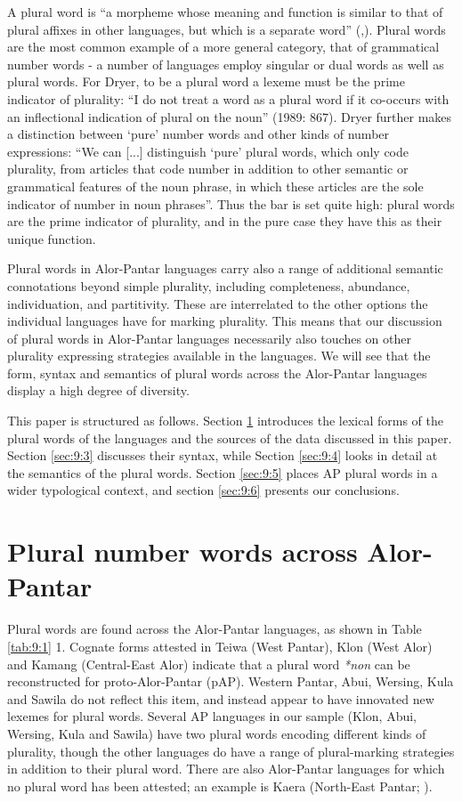 A plural word is ``a morpheme whose meaning and function is similar to that of plural affixes in other languages, but which is a separate word'' (\citealt[865]{Dryer1989},\citealt[166]{Dryer2007}). Plural words are the most common example of a more general category, that of grammatical number words - a number of languages employ singular or dual words as well as plural words. For Dryer, to be a plural word a lexeme must be the prime indicator of plurality: ``I do not treat a word as a plural word if it co-occurs with an inflectional indication of plural on the noun'' (1989: 867). Dryer further makes a distinction between `pure' number words and other kinds of number expressions: ``We can [...] distinguish `pure' plural words, which only code plurality, from articles that code number in addition to other semantic or grammatical features of the noun phrase, in which these articles are the sole indicator of number in noun phrases''. Thus the bar is set quite high: plural words are the prime indicator of plurality, and in the
pure case they have this as their unique function.

 Plural words in Alor-Pantar languages carry also a range of additional semantic connotations beyond simple plurality, including completeness, abundance, individuation, and partitivity. These are interrelated to the other options the individual languages have for marking plurality. This means that our discussion of plural words in Alor-Pantar languages necessarily also touches on other plurality expressing strategies available in the languages. We will see that the form, syntax and semantics of plural words across the Alor-Pantar languages display a high degree of diversity.

This paper is structured as follows. Section \ref{sec:9:2} introduces the lexical forms of the plural words of the languages and the sources of the data discussed in this paper. Section \ref{sec:9:3} discusses their syntax, while Section \ref{sec:9:4} looks in detail at the semantics of the plural words. Section \ref{sec:9:5} places AP plural words in a wider typological context, and section \ref{sec:9:6} presents our conclusions.

\section{Plural number words across Alor-Pantar}  %
\label{sec:9:2}
Plural words are found across the Alor-Pantar languages, as shown in Table \ref{tab:9:1} 1. Cognate forms attested in Teiwa (West Pantar), Klon (West Alor) and Kamang (Central-East Alor) indicate that a plural word \textit{*non} can be reconstructed for proto-Alor-Pantar (pAP). Western Pantar, Abui, Wersing, Kula and Sawila do not reflect this item, and instead appear to have innovated new lexemes for plural words. Several AP languages in our sample (Klon, Abui, Wersing, Kula and Sawila) have two plural words encoding different kinds of plurality, though the other languages do have a range of plural-marking strategies in addition to their plural word. There are also Alor-Pantar languages for which no plural word has been attested; an example is Kaera (North-East Pantar; \citealt{Klamerta}).



